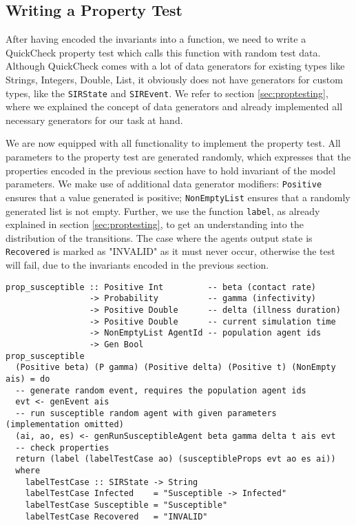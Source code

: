 \subsection{Writing a Property Test}
After having encoded the invariants into a function, we need to write a QuickCheck property test which calls this function with random test data. Although QuickCheck comes with a lot of data generators for existing types like Strings, Integers, Double, List, it obviously does not have generators for custom types, like the \texttt{SIRState} and \texttt{SIREvent}. We refer to section \ref{sec:proptesting}, where we explained the concept of data generators and already implemented all necessary generators for our task at hand.

We are now equipped with all functionality to implement the property test. All parameters to the property test are generated randomly, which expresses that the properties encoded in the previous section have to hold invariant of the model parameters. We make use of additional data generator modifiers: \texttt{Positive} ensures that a value generated is positive; \texttt{NonEmptyList} ensures that a randomly generated list is not empty. Further, we use the function \texttt{label}, as already explained in section \ref{sec:proptesting}, to get an understanding into the distribution of the transitions. The case where the agents output state is \texttt{Recovered} is marked as "INVALID" as it must never occur, otherwise the test will fail, due to the invariants encoded in the previous section.

\begin{footnotesize}
\begin{verbatim}
prop_susceptible :: Positive Int         -- beta (contact rate)
                 -> Probability          -- gamma (infectivity)
                 -> Positive Double      -- delta (illness duration)
                 -> Positive Double      -- current simulation time
                 -> NonEmptyList AgentId -- population agent ids
                 -> Gen Bool
prop_susceptible 
  (Positive beta) (P gamma) (Positive delta) (Positive t) (NonEmpty ais) = do
  -- generate random event, requires the population agent ids
  evt <- genEvent ais
  -- run susceptible random agent with given parameters (implementation omitted)
  (ai, ao, es) <- genRunSusceptibleAgent beta gamma delta t ais evt
  -- check properties
  return (label (labelTestCase ao) (susceptibleProps evt ao es ai))
  where
    labelTestCase :: SIRState -> String
    labelTestCase Infected    = "Susceptible -> Infected"
    labelTestCase Susceptible = "Susceptible"
    labelTestCase Recovered   = "INVALID"
\end{verbatim}
\end{footnotesize}

